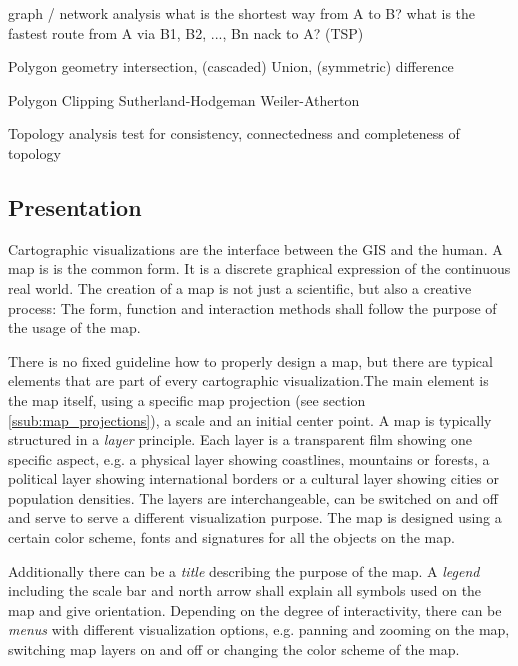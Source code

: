 graph / network analysis
  what is the shortest way from A to B?
  what is the fastest route from A via B1, B2, ..., Bn nack to A? (TSP)

Polygon geometry
  intersection, (cascaded) Union, (symmetric) difference

Polygon Clipping
  Sutherland-Hodgeman
  Weiler-Atherton

Topology analysis
  test for consistency, connectedness and completeness of topology



\subsection{Presentation} %
\label{ssub:presentation}

Cartographic visualizations are the interface between the GIS and the human. A map is is the common form. It is a discrete graphical expression of the continuous real world. The creation of a map is not just a scientific, but also a creative process: The form, function and interaction methods shall follow the purpose of the usage of the map.

There is no fixed guideline how to properly design a map, but there are typical elements that are part of every cartographic visualization.The main element is the map itself, using a specific map projection (see section \ref{ssub:map_projections}), a scale and an initial center point. A map is typically structured in a \emph{layer} principle. Each layer is a transparent film showing one specific aspect, e.g. a physical layer showing coastlines, mountains or forests, a political layer showing international borders or a cultural layer showing cities or population densities. The layers are interchangeable, can be switched on and off and serve to serve a different visualization purpose. The map is designed using a certain color scheme, fonts and signatures for all the objects on the map.

Additionally there can be a \emph{title} describing the purpose of the map. A \emph{legend} including the scale bar and north arrow shall explain all symbols used on the map and give orientation. Depending on the degree of interactivity, there can be \emph{menus} with different visualization options, e.g. panning and zooming on the map, switching map layers on and off or changing the color scheme of the map.
\cite[pp. 159-166]{bolstad2008gis}


